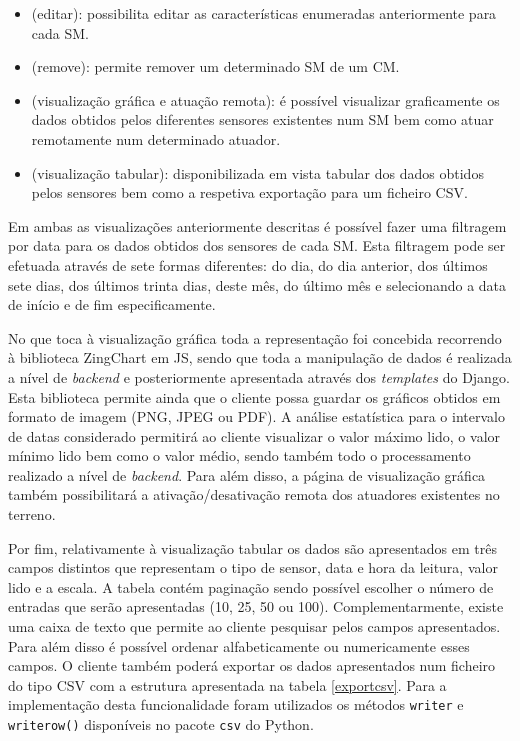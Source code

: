 \begin{itemize}
	\item \faEdit \space (editar): possibilita editar as características enumeradas anteriormente para cada \acl{SM}. 
	\item \faTrash \space (remove): permite remover um determinado \acl{SM} de um \acl{CM}. 
	\item \faBarChart \faCogs \space (visualização gráfica e atuação remota): é possível visualizar graficamente os dados obtidos pelos diferentes sensores existentes num \acl{SM} bem como atuar remotamente num determinado atuador. 
	\item \faDatabase \space (visualização tabular): disponibilizada em vista tabular dos dados obtidos pelos sensores bem como a respetiva exportação para um ficheiro \ac{CSV}. 
\end{itemize}


Em ambas as visualizações anteriormente descritas é possível fazer uma filtragem por data para os dados obtidos dos sensores de cada \acl{SM}. Esta filtragem pode ser efetuada através de sete formas diferentes: do dia, do dia anterior, dos últimos sete dias, dos últimos trinta dias, deste mês, do último mês e selecionando a data de início e de fim especificamente. 


No que toca à visualização gráfica toda a representação foi concebida recorrendo à biblioteca ZingChart em \ac{JS}, sendo que toda a manipulação de dados é realizada a nível de \textit{backend} e posteriormente apresentada através dos \textit{templates} do Django. Esta biblioteca permite ainda que o cliente possa guardar os gráficos obtidos em formato de imagem (PNG, JPEG ou PDF).  A análise estatística para o intervalo de datas considerado permitirá ao cliente visualizar o valor máximo lido, o valor mínimo lido bem como o valor médio, sendo também todo o processamento realizado a nível de \textit{backend}. Para além disso, a página de visualização gráfica também possibilitará a ativação/desativação remota dos atuadores existentes no terreno. 


Por fim, relativamente à visualização tabular os dados são apresentados em três campos distintos que representam o tipo de sensor, data e hora da leitura, valor lido e a escala. A tabela contém paginação sendo possível escolher o número de entradas que serão apresentadas (10, 25, 50 ou 100). Complementarmente, existe uma caixa de texto que permite ao cliente pesquisar pelos campos apresentados. Para além disso é possível ordenar alfabeticamente ou numericamente esses campos. O cliente também poderá exportar os dados apresentados num ficheiro do tipo \ac{CSV} com a estrutura apresentada na tabela \ref{exportcsv}. Para a implementação desta funcionalidade foram utilizados os métodos \texttt{writer} e \texttt{writerow()} disponíveis no pacote \texttt{csv} do Python.  


